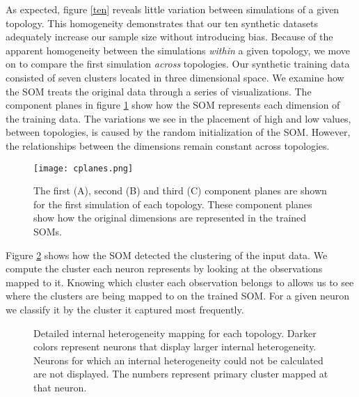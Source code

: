 As expected, figure \ref{ten} reveals little variation 
between simulations of a given topology.  This homogeneity demonstrates that
our ten synthetic datasets adequately increase our sample size without introducing bias.  
Because of the apparent homogeneity between the simulations \emph{within} a
given topology, we move on to compare the first simulation \emph{across} topologies.  
Our synthetic training data consisted of seven clusters located in three
dimensional space. We examine how the SOM treats the original data through a
series of visualizations.  The component planes in figure \ref{cplanes} show
how the SOM represents each dimension of the training data.  The variations we
see in the placement of high and low values, between topologies, is caused by
the random initialization of the SOM.  However, the relationships between the
dimensions remain constant across topologies. 

\begin{figure}[ht]
\begin{minipage}{\textwidth}
  \texttt{[image: cplanes.png]}
  \caption{The first (A), second (B) and third (C) component planes are shown
for the first simulation of each topology.  These component planes show how
the original dimensions are represented in the trained SOMs.}
  \label{cplanes}
\end{minipage}\end{figure}



Figure \ref{cluster} shows how the SOM detected the clustering of the input
data.  We compute the cluster each neuron represents by looking at the
observations mapped to it.  Knowing which cluster each observation belongs to
allows us to see where the clusters are being mapped to on the trained SOM. For a
given neuron we classify it by the cluster it captured most frequently. 

\begin{figure}[htb]
\centering
\begin{minipage}{\textwidth}
\caption{Detailed internal heterogeneity mapping for each topology. Darker colors
represent neurons that display larger internal heterogeneity. Neurons for which
an internal heterogeneity could not be calculated are not displayed. The numbers
represent primary cluster mapped at that neuron.}
\label{cluster}
\end{minipage}
\end{figure}

